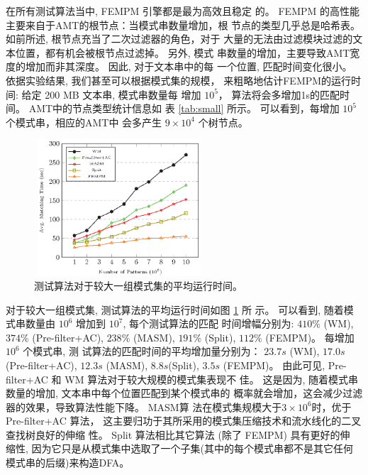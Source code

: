 在所有测试算法当中, \textsf{FEMPM} 引擎都是最为高效且稳定
的。 \textsf{FEMPM} 的高性能主要来自于AMT的根节点：当模式串数量增加，根
节点的类型几乎总是哈希表。 如前所述, 根节点充当了二次过滤器的角色，对于
大量的无法由过滤模块过滤的文本位置，都有机会被根节点过滤掉。 另外, 模式
串数量的增加，主要导致AMT宽度的增加而非其深度。 因此, 对于文本串中的每
一个位置, 匹配时间变化很小。 依据实验结果, 我们甚至可以根据模式集的规模，
来粗略地估计\textsf{FEMPM}的运行时间: 给定 200 MB 文本串, 模式串数量每
增加 $10^5$， 算法将会多增加1s的匹配时间。 AMT中的节点类型统计信息如
表 \ref{tab:small} 所示。 可以看到，每增加 $10^5$ 个模式串，相应的AMT中
会多产生 $9 \times 10^4$ 个树节点。

\begin{figure}[!h]
  \centering
  \includegraphics[height=2in, width=2.5in]{figures/2_MPM/large_group}
  \caption{测试算法对于较大一组模式集的平均运行时间。}
  \label{fig:large_group}
\end{figure}

对于较大一组模式集, 测试算法的平均运行时间如图 \ref{fig:large_group} 所
示。 可以看到, 随着模式串数量由 $10^6$ 增加到 $10^7$, 每个测试算法的匹配
时间增幅分别为: $410\%$ (\textsf{WM}), $374\%$
(\textsf{Pre-filter+AC}), $238\%$ (\textsf{MASM}), $191\%$
(\textsf{Split}), $112\%$ (\textsf{FEMPM})。 每增加 $10^6$ 个模式串, 测
试算法的匹配时间的平均增加量分别为： $23.7s$ (\textsf{WM}), $17.0s$
(\textsf{Pre-filter+AC}), $12.3s$ (\textsf{MASM}),
$8.8s$(\textsf{Split}), $3.5s$ (\textsf{FEMPM})。 由此可见,
\textsf{Pre-filter+AC} 和 \textsf{WM} 算法对于较大规模的模式集表现不
佳。 这是因为, 随着模式串数量的增加, 文本串中每个位置匹配到某个模式串的
概率就会增加，这会减少过滤器的效果，导致算法性能下降。 \textsf{MASM}算
法在模式集规模大于$3 \times 10^6$时，优于 \textsf{Pre-filter+AC} 算法，
这主要归功于其所采用的模式集压缩技术和流水线化的二叉查找树良好的伸缩
性。 \textsf{Split} 算法相比其它算法 (除了 \textsf{FEMPM}) 具有更好的伸
缩性, 因为它只是从模式集中选取了一个子集(其中的每个模式串都不是其它任何
模式串的后缀)来构造DFA。

